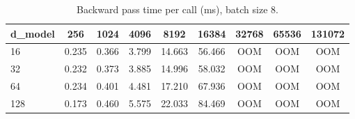 \begin{table}
\centering
\begin{tabular}{lcccccccc}
\toprule
d\_model & 256 & 1024 & 4096 & 8192 & 16384 & 32768 & 65536 & 131072 \\
\midrule
16 & 0.235 & 0.366 & 3.799 & 14.663 & 56.466 & OOM & OOM & OOM \\
32 & 0.232 & 0.373 & 3.885 & 14.996 & 58.032 & OOM & OOM & OOM \\
64 & 0.234 & 0.401 & 4.481 & 17.210 & 67.936 & OOM & OOM & OOM \\
128 & 0.173 & 0.460 & 5.575 & 22.033 & 84.469 & OOM & OOM & OOM \\
\bottomrule
\end{tabular}
\caption{Backward pass time per call (ms), batch size 8.}
\label{tab:attn_backward_ms}
\end{table}
